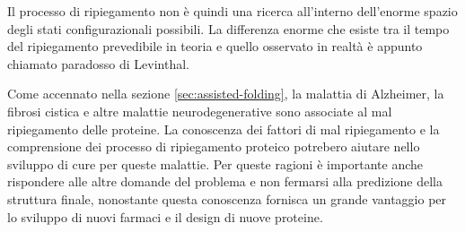 {\par Il processo di ripiegamento non è quindi una ricerca all'interno dell'enorme spazio degli stati configurazionali possibili. La differenza enorme che esiste tra il tempo del ripiegamento prevedibile in teoria e quello osservato in realtà è appunto chiamato paradosso di Levinthal.

\par Come accennato nella sezione \ref{sec:assisted-folding}, la malattia di Alzheimer, la fibrosi cistica e altre malattie neurodegenerative sono associate al mal ripiegamento delle proteine. La conoscenza dei fattori di mal ripiegamento e la comprensione dei processo di ripiegamento proteico potrebero aiutare nello sviluppo di cure per queste malattie. Per queste ragioni è importante anche rispondere alle altre domande del problema e non fermarsi alla predizione della struttura finale, nonostante questa conoscenza fornisca un grande vantaggio per lo sviluppo di nuovi farmaci e il design di nuove proteine.
}
\clearpage